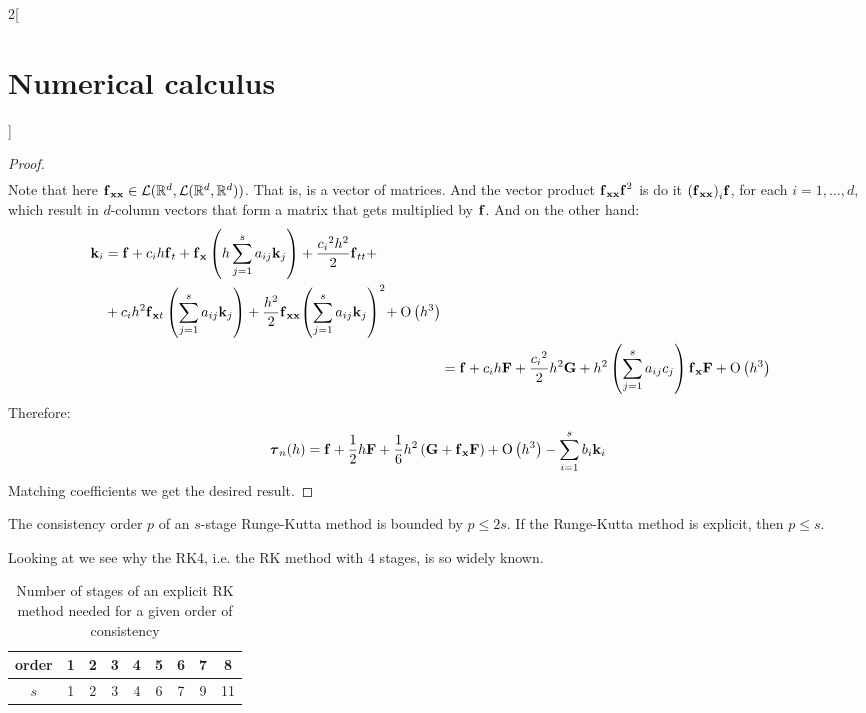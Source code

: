 \documentclass[../../../main_math.tex]{subfiles}
\begin{document}
\begin{multicols}{2}[\section{Numerical calculus}]
\begin{proof}
\begin{align*}
    \end{align*}
    Note that here $\boldsymbol{\mathrm{f}}_{\boldsymbol{\mathrm{xx}}}\in\mathcal{L}(\mathbb{R}^d,\mathcal{L}(\mathbb{R}^d,\mathbb{R}^d))$. That is, is a vector of matrices. And the vector product ${\boldsymbol{\mathrm{f}}_{\boldsymbol{\mathrm{xx}}}}\boldsymbol{\mathrm{f}}^2$ is do it ${(\boldsymbol{\mathrm{f}}_{\boldsymbol{\mathrm{xx}}})}_i\boldsymbol{\mathrm{f}}$, for each $i=1,\ldots,d$, which result in $d$-column vectors that form a matrix that gets multiplied by $\boldsymbol{\mathrm{f}}$.
    And on the other hand:
    \begin{align*}
      \begin{split}
        \boldsymbol{\mathrm{k}}_i & =\boldsymbol{\mathrm{f}}+c_i h\boldsymbol{\mathrm{f}}_t+\boldsymbol{\mathrm{f}}_{\boldsymbol{\mathrm{x}}}\left(h\sum_{j=1}^{s}a_{ij}\boldsymbol{\mathrm{k}}_j\right)+\frac{{c_i}^2 h^2}{2}\boldsymbol{\mathrm{f}}_{tt}+\\
        &+c_i h^2\boldsymbol{\mathrm{f}}_{\boldsymbol{\mathrm{x}}t}\left(\sum_{j=1}^{s}a_{ij}\boldsymbol{\mathrm{k}}_j\right)+\frac{h^2}{2}\boldsymbol{\mathrm{f}}_{\boldsymbol{\mathrm{xx}}}{\left(\sum_{j=1}^{s}a_{ij}\boldsymbol{\mathrm{k}}_j\right)}^2\!+\mathrm{O}\left(h^3\right)
      \end{split} \\
       & =\boldsymbol{\mathrm{f}}+c_i h\boldsymbol{\mathrm{F}}+\frac{{c_i}^2}{2}h^2\boldsymbol{\mathrm{G}}+h^2\left(\sum_{j=1}^{s}a_{ij}c_j\right)\boldsymbol{\mathrm{f}}_{\boldsymbol{\mathrm{x}}}\boldsymbol{\mathrm{F}}+\mathrm{O}\left(h^3\right)                                       \\
    \end{align*}
    Therefore:
    $$\boldsymbol{\mathrm{\tau}}_{n}(h)=\boldsymbol{\mathrm{f}}+\frac{1}{2}h\boldsymbol{\mathrm{F}}+\frac{1}{6}h^2\left(\boldsymbol{\mathrm{G}}+\boldsymbol{\mathrm{f}}_{\boldsymbol{\mathrm{x}}}\boldsymbol{\mathrm{F}}\right)+\mathrm{O}\left(h^3\right)-\sum_{i=1}^sb_i\boldsymbol{\mathrm{k}}_i$$
    Matching coefficients we get the desired result.
  \end{proof}
  \begin{lemma}
    The consistency order $p$ of an $s$-stage Runge-Kutta method is bounded by $p\leq 2 s$. If the Runge-Kutta method is explicit, then $p\leq s$.
  \end{lemma}
  \begin{remark}
    Looking at  we see why the RK4, i.e. the RK method with 4 stages, is so widely known.
  \end{remark}
  \begin{table}[H]
    \centering
    \begin{tabular}{c|cccccccc}
      order & 1 & 2 & 3 & 4 & 5 & 6 & 7 & 8  \\
      \hline
      $s$   & 1 & 2 & 3 & 4 & 6 & 7 & 9 & 11
    \end{tabular}
    \caption{Number of stages of an explicit RK method needed for a given order of consistency}
    \label{NC:stages-orderRK}
  \end{table}

\end{multicols}
\end{document}

